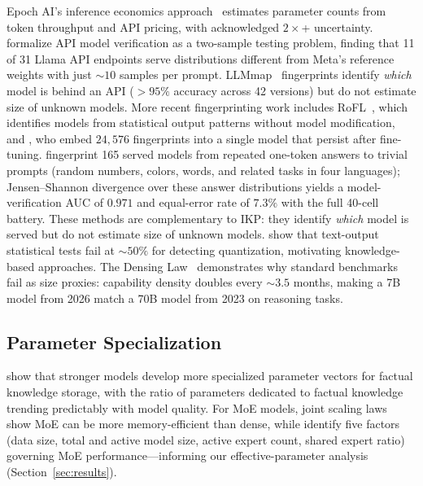 \documentclass[11pt]{article}
\begin{document}
Epoch AI's inference economics approach~\citep{epochai2024} estimates parameter counts from token throughput and API pricing, with acknowledged $2\times$+ uncertainty. \citet{gao2025modelequality} formalize API model verification as a two-sample testing problem, finding that 11 of 31 Llama API endpoints serve distributions different from Meta's reference weights with just ${\sim}10$ samples per prompt. LLMmap~\citep{llmmap2025} fingerprints identify \emph{which} model is behind an API ($>95\%$ accuracy across 42 versions) but do not estimate size of unknown models. More recent fingerprinting work includes RoFL~\citep{tsai2025rofl}, which identifies models from statistical output patterns without model modification, and \citet{nasery2025fingerprinting}, who embed $24{,}576$ fingerprints into a single model that persist after fine-tuning. \citet{bruckner2026onetoken} fingerprint 165 served models from repeated one-token answers to trivial prompts (random numbers, colors, words, and related tasks in four languages); Jensen--Shannon divergence over these answer distributions yields a model-verification AUC of $0.971$ and equal-error rate of $7.3\%$ with the full 40-cell battery. These methods are complementary to IKP: they identify \emph{which} model is served but do not estimate size of unknown models. \citet{cai2025substitution} show that text-output statistical tests fail at ${\sim}50\%$ for detecting quantization, motivating knowledge-based approaches. The Densing Law~\citep{densing2025} demonstrates why standard benchmarks~\citep{hendrycks2021measuring, joshi2017triviaqa, kwiatkowski2019natural, liang2023holistic} fail as size proxies: capability density doubles every ${\sim}3.5$ months, making a 7B model from 2026 match a 70B model from 2023 on reasoning tasks.

\subsection{Parameter Specialization}

\citet{hong2025} show that stronger models develop more specialized parameter vectors for factual knowledge storage, with the ratio of parameters dedicated to factual knowledge trending predictably with model quality. For MoE models, joint scaling laws~\citep{ludziejewski2025moe} show MoE can be more memory-efficient than dense, while \citet{zhao2025moescaling} identify five factors (data size, total and active model size, active expert count, shared expert ratio) governing MoE performance---informing our effective-parameter analysis (Section~\ref{sec:results}).
\end{document}
